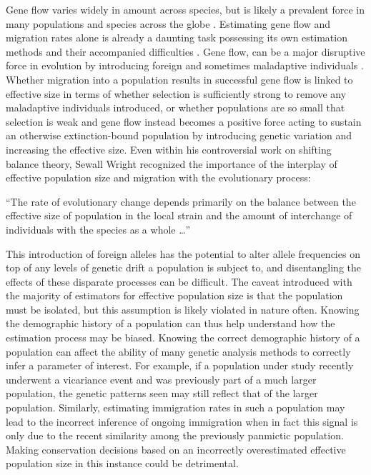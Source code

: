 Gene flow varies widely in amount across species, but is likely a prevalent force in many populations and species across the globe \citep{Slatkin:1985, Slatkin:1987}. 
Estimating gene flow and migration rates alone is already a daunting task possessing its own estimation methods and their accompanied difficulties \citep{Beerli:2001, Hey:2004, Kuhner:2006, Whitlock:1999}. Gene flow, can be a major disruptive force in evolution by introducing foreign and sometimes maladaptive individuals \citep{Slatkin:1987}. Whether migration into a population results in successful gene flow is linked to effective size in terms of whether selection is sufficiently strong to remove any maladaptive individuals introduced, or whether populations are so small that selection is weak and gene flow instead becomes a positive force acting to sustain an otherwise extinction-bound population by introducing genetic variation and increasing the effective size. Even within his controversial work on shifting balance theory, Sewall Wright recognized the importance of the interplay of effective population size and migration with the evolutionary process: %
\begin{quoteshrink}
  ``The rate of evolutionary change depends primarily on the balance between the effective size of population in the local strain and the amount of interchange of individuals with the species as a whole \dots''
  \hfill\citet{Wright:1930}
\end{quoteshrink}
This introduction of foreign alleles has the potential to alter allele frequencies on top of any levels of genetic drift a population is subject to, and disentangling the effects of these disparate processes can be difficult. The caveat introduced with the majority of estimators for effective population size is that the population must be isolated, but this assumption is likely violated in nature often. Knowing the demographic history of a population can thus help understand how the estimation process may be biased. Knowing the correct demographic history of a population can affect the ability of many genetic analysis methods to correctly infer a parameter of interest. For example, if a population under study recently underwent a vicariance event and was previously part of a much larger population, the genetic patterns seen may still reflect that of the larger population. Similarly, estimating immigration rates in such a population may lead to the incorrect inference of ongoing immigration when in fact this signal is only due to the recent similarity among the previously panmictic population. Making conservation decisions based on an incorrectly overestimated effective population size in this instance could be detrimental.

